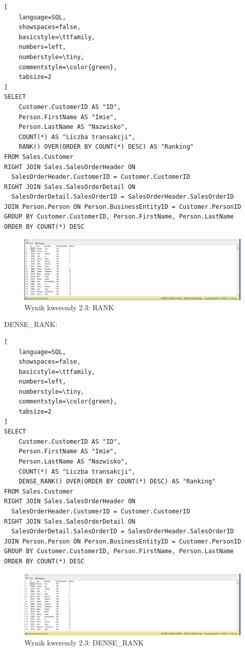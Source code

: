 \documentclass[a4paper,12pt]{article}
\begin{document}
{\small
\begin{lstlisting}[
	language=SQL,
	showspaces=false,
	basicstyle=\ttfamily,
	numbers=left,
	numberstyle=\tiny,
	commentstyle=\color{green},
	tabsize=2
]
SELECT 
	Customer.CustomerID AS "ID",
	Person.FirstName AS "Imie",
	Person.LastName AS "Nazwisko",
	COUNT(*) AS "Liczba transakcji",
	RANK() OVER(ORDER BY COUNT(*) DESC) AS "Ranking"
FROM Sales.Customer
RIGHT JOIN Sales.SalesOrderHeader ON 
  SalesOrderHeader.CustomerID = Customer.CustomerID
RIGHT JOIN Sales.SalesOrderDetail ON 
  SalesOrderDetail.SalesOrderID = SalesOrderHeader.SalesOrderID
JOIN Person.Person ON Person.BusinessEntityID = Customer.PersonID
GROUP BY Customer.CustomerID, Person.FirstName, Person.LastName
ORDER BY COUNT(*) DESC
\end{lstlisting}}

\begin{figure}[H]
  \centering
  \includegraphics[width=1.0\textwidth]{images/2.3.png}
  \caption{Wynik kwerendy 2.3: RANK}
\end{figure}

DENSE\_RANK:

{\small
  \begin{lstlisting}[
	language=SQL,
	showspaces=false,
	basicstyle=\ttfamily,
	numbers=left,
	numberstyle=\tiny,
	commentstyle=\color{green},
	tabsize=2
]
SELECT 
	Customer.CustomerID AS "ID",
	Person.FirstName AS "Imie",
	Person.LastName AS "Nazwisko",
	COUNT(*) AS "Liczba transakcji",
	DENSE_RANK() OVER(ORDER BY COUNT(*) DESC) AS "Ranking"
FROM Sales.Customer
RIGHT JOIN Sales.SalesOrderHeader ON 
  SalesOrderHeader.CustomerID = Customer.CustomerID
RIGHT JOIN Sales.SalesOrderDetail ON 
  SalesOrderDetail.SalesOrderID = SalesOrderHeader.SalesOrderID
JOIN Person.Person ON Person.BusinessEntityID = Customer.PersonID
GROUP BY Customer.CustomerID, Person.FirstName, Person.LastName
ORDER BY COUNT(*) DESC
\end{lstlisting}}

\begin{figure}[H]
  \centering
  \includegraphics[width=1.0\textwidth]{images/2.3_dense.png}
  \caption{Wynik kwerendy 2.3: DENSE\_RANK}
\end{figure}
\end{document}
